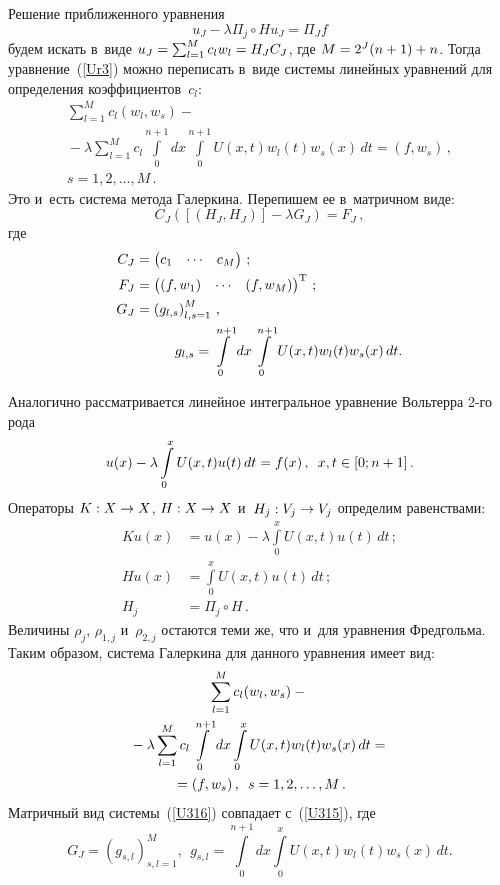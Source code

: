\begin{multicols}{2}
Решение приближенного уравнения
\begin{equation}
\label{Ur3}
u_J-\lambda\Pi_j\circ H u_J=\Pi_J f
\end{equation}
будем искать в~виде $u_J\hm=\sum\nolimits_{l=1}^{M} c_l w_l 
\hm= {H}_J{C}_J $, где $M\hm=2^{J}(n+1)+n$. 
Тогда уравнение~(\ref{Ur3}) можно переписать в~виде
системы линейных уравнений для определения коэффициентов~$c_l$:
\begin{multline*}
\sum\limits_{l=1}^{M} c_l (w_l,w_s)-{}\\
{}-\lambda
\sum\limits_{l=1}^{M} c_l \int\limits_{0}^{n+1}dx
\int\limits_{0}^{n+1}U(x,t)w_l(t)w_s(x)\,dt = (f,w_s)\,,\\
s=1,2,\dots,M\,.
\end{multline*}
Это и~есть система метода Галеркина. Перепишем ее в~матричном виде:
\begin{equation}
\label{U315}
{C}_J\left([({H}_J,{H}_J)]-
\lambda{G}_J\right)={F}_J\,,
\end{equation}
где 
\begin{align*}
{C}_J&=\begin{pmatrix}
c_1&\cdots &c_M\end{pmatrix}\,;\\ 
{F}_J&=\begin{pmatrix}(f,w_1)&\cdots &(f,w_M)\end{pmatrix}^{\mathrm{T}}\,;\\
{G}_J&=\left(g_{l,s}\right)_{l,s=1}^M\,,
\\ 
&\hspace*{10mm}g_{l,s}= \int\limits_{0}^{n+1}dx\int\limits_{0}^{n+1}U(x,t)w_l(t)w_s(x)\,dt.
\end{align*}

Аналогично рассматривается линейное интегральное уравнение Вольтерра 2-го рода
$$
u(x)-\lambda\int\limits_{0}^{x}U(x,t)u(t)\,dt =f(x)\,,\enskip 
x,t\in [0;n+1]\,.
$$
Операторы $K:X\hm\to X$, $H:X\hm\to X$ и~$H_j : V_j\hm\to V_j$ определим равенствами:
\begin{align*}
Ku(x)&=u(x)-\lambda\int\limits_0^{x} U(x,t)u(t)\,dt\,;\\
Hu(x)&=\int\limits_0^{x} U(x,t)u(t)\,dt\,;\\
H_j&=\Pi_j\circ H\,.
\end{align*}
Величины $\rho_j$, $\rho_{1,j}$ и~$\rho_{2,j}$ остаются теми же, что и~для 
уравнения Фредгольма.  Таким образом,
система Галеркина для данного уравнения имеет вид:
\begin{multline}
\label{U316}
\sum\limits_{l=1}^{M} c_l (w_l,w_s)-{}\\
{}-
\lambda\sum\limits_{l=1}^{M} 
c_l \int\limits_{0}^{n+1}dx\int\limits_{0}^{x}U(x,t)w_l(t)w_s(x)\,dt ={}\\
{}=(f,w_s)\,,\enskip
s=1,2,\dots,M\,.
\end{multline}
Матричный вид системы~(\ref{U316}) совпадает с~(\ref{U315}), где
$$
{G}_J=(g_{s,l})_{s,l=1}^M,\ \ g_{s,l}= 
\int\limits_{0}^{n+1}\!dx\int\limits_{0}^{x}\!U(x,t)w_l(t)w_s(x)\,dt.
$$


\end{multicols}
